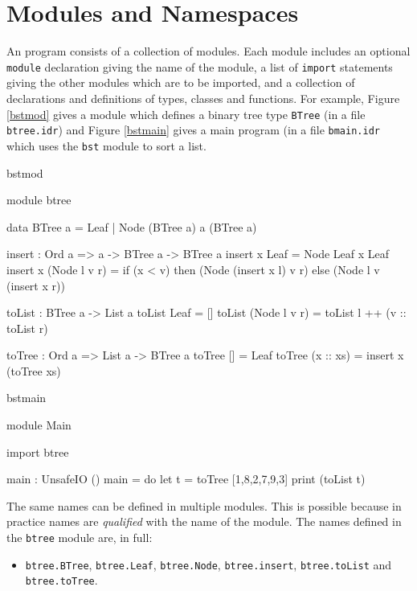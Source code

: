 \section{Modules and Namespaces}
\label{sect:namespaces}

An \Idris{} program consists of a collection of modules. Each module includes
an optional \texttt{module} declaration giving the name of the module, a
list of \texttt{import} statements giving the other modules which are to be imported,
and a collection of declarations and definitions of types, classes and functions.
For example, Figure \ref{bstmod} gives a module which defines a binary
tree type \texttt{BTree} (in a file \texttt{btree.idr}) and Figure
\ref{bstmain} gives a main program (in a file \texttt{bmain.idr} which uses the
\texttt{bst} module to sort a list.

\begin{SaveVerbatim}{bstmod}

module btree

data BTree a = Leaf
             | Node (BTree a) a (BTree a)

insert : Ord a => a -> BTree a -> BTree a
insert x Leaf = Node Leaf x Leaf
insert x (Node l v r) = if (x < v) then (Node (insert x l) v r)
                                   else (Node l v (insert x r))

toList : BTree a -> List a
toList Leaf = []
toList (Node l v r) = toList l ++ (v :: toList r)

toTree : Ord a => List a -> BTree a
toTree [] = Leaf
toTree (x :: xs) = insert x (toTree xs)

\end{SaveVerbatim}

\begin{SaveVerbatim}{bstmain}

module Main

import btree

main : UnsafeIO ()
main = do let t = toTree [1,8,2,7,9,3] 
          print (toList t)

\end{SaveVerbatim}

\noindent
The same names can be defined in multiple modules. This is possible because in practice names
are \emph{qualified} with the name of the module. 
The names defined in the \texttt{btree} module are, in full:

\begin{itemize}
\item \texttt{btree.BTree}, \texttt{btree.Leaf}, \texttt{btree.Node}, \texttt{btree.insert},
\texttt{btree.toList} and \texttt{btree.toTree}.
\end{itemize}

